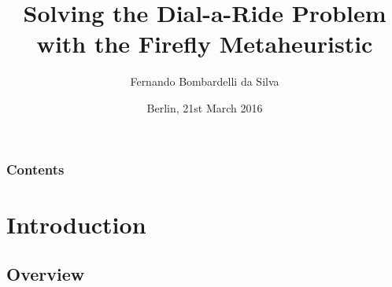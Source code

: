 \documentclass{beamer}
\title[Bachelorarbeit in Informatik: Solving the DARP with the Firefly Metaheuristic]{Solving the Dial-a-Ride Problem with the Firefly Metaheuristic} %
\author[Fernando Bombardelli da Silva]{Fernando Bombardelli da Silva} %
\institute[Technische Universität Berlin] %
{
Technische Universität Berlin \\ %
Fakultät IV Elektrotechnik und Informatik \\
Bachelorstudiengang Informatik \\
\medskip
\textbf{Bachelorarbeit} \\
\textbf{Advisor: Dr.-Ing. Axel Heßler}\\
\medskip
\textit{bombardelli.f@gmail.com} %
}
\date{Berlin, 21st March 2016} %
\begin{document}
\begin{frame}
\titlepage %
\end{frame}

\begin{frame}
\frametitle{Contents} %
\tableofcontents %
\end{frame}


\section{Introduction} %

\subsection{Overview}
\end{document}
